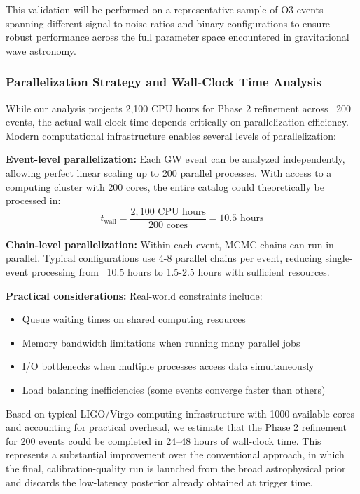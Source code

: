 \documentclass[12pt]{article}
\begin{document}
This validation will be performed on a representative sample of O3 events spanning different signal-to-noise ratios and binary configurations to ensure robust performance across the full parameter space encountered in gravitational wave astronomy.

\subsubsection{Parallelization Strategy and Wall-Clock Time Analysis}

While our analysis projects 2,100 CPU hours for Phase 2 refinement across ~200 events, the actual wall-clock time depends critically on parallelization efficiency. Modern computational infrastructure enables several levels of parallelization:

\textbf{Event-level parallelization:} Each GW event can be analyzed independently, allowing perfect linear scaling up to 200 parallel processes. With access to a computing cluster with 200 cores, the entire catalog could theoretically be processed in:
\begin{equation}
t_{\text{wall}} = \frac{2,100 \text{ CPU hours}}{200 \text{ cores}} = 10.5 \text{ hours}
\end{equation}

\textbf{Chain-level parallelization:} Within each event, MCMC chains can run in parallel. Typical configurations use 4-8 parallel chains per event, reducing single-event processing from ~10.5 hours to 1.5-2.5 hours with sufficient resources.

\textbf{Practical considerations:} Real-world constraints include:
\begin{itemize}
    \item Queue waiting times on shared computing resources
    \item Memory bandwidth limitations when running many parallel jobs
    \item I/O bottlenecks when multiple processes access data simultaneously
    \item Load balancing inefficiencies (some events converge faster than others)
\end{itemize}

Based on typical LIGO/Virgo computing infrastructure with 1000 available cores and accounting for practical overhead, we estimate that the Phase 2 refinement for 200 events could be completed in 24--48 hours of wall-clock time. This represents a substantial improvement over the conventional approach, in which the final, calibration-quality run is launched from the broad astrophysical prior and discards the low-latency posterior already obtained at trigger time.
\end{document}

